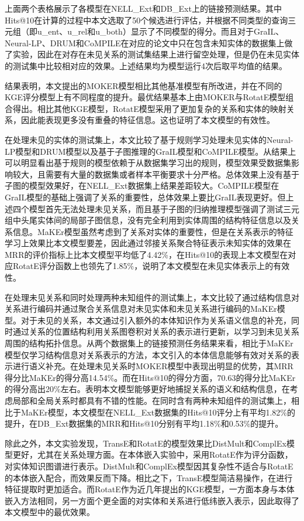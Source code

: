 上面两个表格展示了各模型在NELL\_Ext和DB\_Ext上的链接预测结果。其中Hits@10在计算的过程中本文选取了50个候选进行评估，并根据不同类型的查询三元组（即u\_ent、u\_rel和u\_both）显示了不同模型的得分。而且对于GraIL、Neural-LP、DRUM和CoMPILE在对应的论文中只在包含未知实体的数据集上做了实验，因此在对存在未见关系的测试集结果上进行留空处理，但是仍在未见实体的测试集中比较相对应的效果。上述结果均为模型运行4次后取平均值的结果。

结果表明，本文提出的MOKER模型相比其他基准模型有所改进，并在不同的KGE评分模型上有不同程度的提升。最优结果基本上由MOKER与RotatE模型组合得出。相比其他KGE模型，RotatE模型采用了更加复杂的关系和实体的映射关系，因此能表现更多没有重叠的特征信息。这也证明了本文模型的有效性。

在处理未见的实体的测试集上，本文比较了基于规则学习处理未见实体的Neural-LP模型和DRUM模型以及基于子图推理的GraIL模型和CoMPILE模型。从结果上可以明显看出基于规则的模型依赖于从数据集学习出的规则，模型效果受数据集影响较大，且需要有大量的数据集或者样本平衡要求十分严格。总体效果上没有基于子图的模型效果好，在NELL\_Ext数据集上结果差距较大。CoMPILE模型在GraIL模型的基础上强调了关系的重要性，总体效果上要比GraIL表现更好。但上述四个模型首先无法处理未见关系，而且基于子图的归纳推理模型强调了测试三元组中头尾实体间的局部子图信息，没有完全利用到实体周围的结构特征信息以及关系信息。MaKEr模型虽然考虑到了关系对实体的重要性，但是在关系表示的特征学习上效果比本文模型要差，因此通过邻接关系聚合特征表示未知实体的效果在MRR的评价指标上比本文模型平均低了4.42\%，在Hits@10的表现上本文模型在对应RotatE评分函数上也领先了1.85\%，说明了本文模型在未见实体表示上的有效性。

在处理未见关系和同时处理两种未知组件的测试集上，本文比较了通过结构信息对关系进行编码并通过聚合关系信息对未见实体和未见关系进行编码的MaKEr模型。对于未见的关系，本文通过引入额外的本体知识作为关系语义信息的补充，同时通过关系的位置结构利用关系图卷积对关系的表示进行更新，以学习到未见关系周围的结构拓扑信息。从两个数据集上的链接预测任务结果来看，相比于MaKEr模型仅学习结构信息对关系表示的方法，本文引入的本体信息能够有效对关系的表示进行语义补充。在处理未见关系时MOKER模型中表现出明显的优势，其MRR得分比MaKEr的得分高14.54\%。而在Hits@10的得分方面，70.63的得分比MaKEr的得分高出20\%左右。表明本文模型能够更好地捕捉关系的语义和结构信息，在考虑局部和全局关系时都具有不错的性能。在同时含有两种未知组件的测试集上，相比于MaKEr模型，本文模型在NELL\_Ext数据集的Hits@10评分上有平均1.82\%的提升，在DB\_Ext数据集的MRR和Hits@10分别有平均1.18\%和0.53\%的提升。

除此之外，本文实验发现，TransE和RotatE的模型效果比DistMult和ComplEx模型更好，尤其在关系处理方面。在本体嵌入实验中，采用RotatE作为评分函数，对实体知识图谱进行表示。DistMult和ComplEx模型因其复杂性不适合与RotatE的本体嵌入配合，而效果反而下降。相比之下，TransE模型简洁易操作，在进行特征提取时更加适合。而RotatE作为近几年提出的KGE模型，一方面本身与本体嵌入方法相同，另一方面个更全面的对实体和关系进行低纬嵌入表示，因此取得了本文模型中的最优效果。

